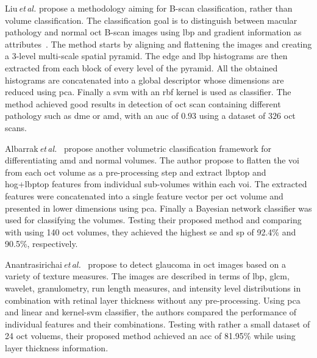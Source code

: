 %
Liu\,\textit{et\,al.} propose a methodology aiming for B-scan classification, rather than volume classification.
The classification goal is to distinguish between macular pathology and normal \gls{oct} B-scan images using \gls{lbp} and gradient information as attributes~\cite{Liu2011}.
%
The method starts by aligning and flattening the images and creating a $3$-level multi-scale spatial pyramid.
The edge and \gls{lbp} histograms are then extracted from each block of every level of the pyramid.
All the obtained histograms are concatenated into a global descriptor whose dimensions are reduced using \gls{pca}.
Finally a \gls{svm} with an \gls{rbf} kernel is used as classifier.
%
The method achieved good results in detection of \gls{oct} scan containing different pathology such as \gls{dme} or \gls{amd}, with an \gls{auc} of $0.93$ using a dataset of $326$ \gls{oct} scans.

Albarrak\,\textit{et\,al.}~\cite{albarrak2013age} propose another volumetric classification framework for differentiating \gls{amd} and normal volumes.
%
The author propose to flatten the \gls{voi} from each \gls{oct} volume as a pre-processing step and extract \gls{lbptop} and \gls{hog}+\gls{lbptop} features from individual sub-volumes within each \gls{voi}.
The extracted features were concatenated into a single feature vector per \gls{oct} volume and presented in lower dimensions using \gls{pca}.
Finally a Bayesian network classifier was used for classifying the volumes.
%
Testing their proposed method and comparing with \cite{Liu2011} using 140 \gls{oct} volumes, they achieved the highest \gls{se} and \gls{sp} of 92.4\% and 90.5\%, respectively.

Anantrasirichai\,\textit{et\,al.}~\cite{anantrasirichai2013svm} propose to detect glaucoma in \gls{oct} images based on a variety of texture measures.
%
The images are described in terms of \gls{lbp}, \gls{glcm}, wavelet, granulometry, run length measures, and intensity level distributions in combination with retinal layer thickness without any pre-processing.
Using \gls{pca} and linear and kernel-\gls{svm} classifier, the authors compared the performance of individual features and their combinations.
%
Testing with rather a small dataset of 24 \gls{oct} voluems, their proposed method achieved an \gls{acc} of 81.95\% while using layer thickness information.


